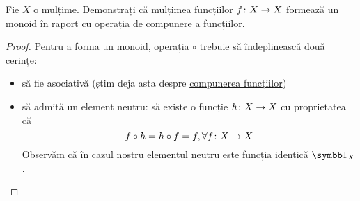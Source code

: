 \begin{exercise}
Fie \(X\) o mulțime. Demonstrați că mulțimea funcțiilor \(f \colon X \to X\) formează un monoid în raport cu operația de compunere a funcțiilor. 
\end{exercise}
\begin{proof}
Pentru a forma un monoid, operația \(\circ\) trebuie să îndeplinească două cerințe:
\begin{itemize}
    \item să fie asociativă (știm deja asta despre \href{https://en.wikipedia.org/wiki/Function_composition#Properties}{compunerea funcțiilor})
    \item să admită un element neutru: să existe o funcție \(h \colon X \to X\) cu proprietatea că
    \[
        f \circ h = h \circ f = f, \forall f \colon X \to X
    \]
    Observăm că în cazul nostru elementul neutru este funcția identică \(\identity{X}\).
\end{itemize}
\end{proof}